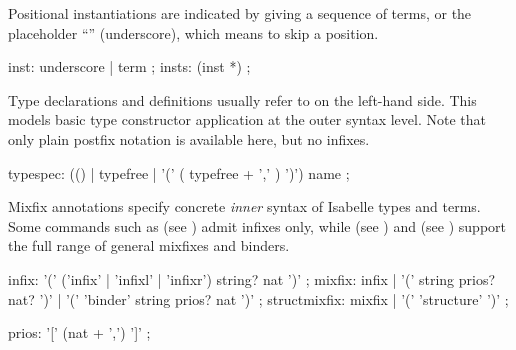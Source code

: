 \begin{isabellebody}
\begin{isamarkuptext}
  Positional instantiations are indicated by giving a sequence of
  terms, or the placeholder ``\isa{{\isacharunderscore}}'' (underscore), which means to
  skip a position.

  \begin{rail}
    inst: underscore | term
    ;
    insts: (inst *)
    ;
  \end{rail}

  Type declarations and definitions usually refer to
   on the left-hand side.  This models basic
  type constructor application at the outer syntax level.  Note that
  only plain postfix notation is available here, but no infixes.

  \begin{rail}
    typespec: (() | typefree | '(' ( typefree + ',' ) ')') name
    ;
  \end{rail}%
\end{isamarkuptext}%
\isamarkuptrue%
%
\isamarkuptrue%
%
\begin{isamarkuptext}%
Mixfix annotations specify concrete \emph{inner} syntax of Isabelle
  types and terms.  Some commands such as \hyperlink{command.types}{\mbox{}} (see
  ) admit infixes only, while \hyperlink{command.consts}{\mbox{}} (see ) and \hyperlink{command.syntax}{\mbox{}} (see
  ) support the full range of general mixfixes
  and binders.

  \begin{rail}
    infix: '(' ('infix' | 'infixl' | 'infixr') string? nat ')'
    ;
    mixfix: infix | '(' string prios? nat? ')' | '(' 'binder' string prios? nat ')'
    ;
    structmixfix: mixfix | '(' 'structure' ')'
    ;

    prios: '[' (nat + ',') ']'
    ;
  \end{rail}


\end{isamarkuptext}
\end{isabellebody}
